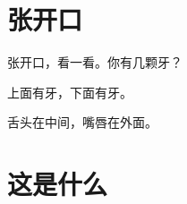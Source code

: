 \documentclass[12pt,UTF-8,openany]{ctexbook}
\begin{document}
\hanzibox{}\hanzibox{}\hanzibox{}\hanzibox{}\hspace{1em}\hanzibox{}\hanzibox{}\hanzibox{}\hanzibox{}

\hanzibox{}\hanzibox{}\hanzibox{}\hanzibox{}\hspace{1em}\hanzibox{}\hanzibox{}\hanzibox{}\hanzibox{}

\hanzibox{}\hanzibox{}\hanzibox{}\hanzibox{}\hspace{1em}\hanzibox{}\hanzibox{}\hanzibox{}\hanzibox{}

\hanzibox{}\hanzibox{}\hanzibox{}\hanzibox{}\hspace{1em}\hanzibox{}\hanzibox{}\hanzibox{}\hanzibox{}






\chapter{张开口}

\begin{large}
    
    张开口，看一看。你有几颗牙？
    
    上面有牙，下面有牙。
    
    舌头在中间，嘴唇在外面。
    
\end{large}


\clearpage

\begin{center}
    
\end{center}


\hanzibox{}\hanzibox{}\hanzibox{}\hanzibox{}\hspace{1em}\hanzibox{}\hanzibox{}\hanzibox{}\hanzibox{}

\hanzibox{}\hanzibox{}\hanzibox{}\hanzibox{}\hspace{1em}\hanzibox{}\hanzibox{}\hanzibox{}\hanzibox{}

\hanzibox{}\hanzibox{}\hanzibox{}\hanzibox{}\hspace{1em}




\chapter{这是什么}
\end{document}

